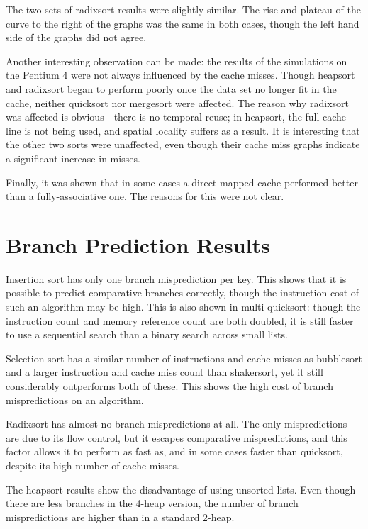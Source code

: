 The two sets of radixsort results were slightly similar. The rise and plateau of
the curve to the right of the graphs was the same in both cases, though the left
hand side of the graphs did not agree.

Another interesting observation can be made: the results of the simulations on
the Pentium 4 were not always influenced by the cache misses. Though heapsort
and radixsort began to perform poorly once the data set no longer fit in the
cache, neither quicksort nor mergesort were affected. The reason why radixsort
was affected is obvious - there is no temporal reuse; in heapsort, the full
cache line is not being used, and spatial locality suffers as a result. It is
interesting that the other two sorts were unaffected, even though their cache
miss graphs indicate a significant increase in misses.

Finally, it was shown that in some cases a direct-mapped cache performed better
than a fully-associative one. The reasons for this were not clear.

\section{Branch Prediction Results}

Insertion sort has only one branch misprediction per key. This shows that it is
possible to predict comparative branches correctly, though the instruction cost
of such an algorithm may be high. This is also shown in multi-quicksort: though
the instruction count and memory reference count are both doubled, it is still
faster to use a sequential search than a binary search across small lists.

Selection sort has a similar number of instructions and cache misses as
bubblesort and a larger instruction and cache miss count than shakersort, yet it
still considerably outperforms both of these. This shows the high cost of branch
mispredictions on an algorithm.

Radixsort has almost no branch mispredictions at all. The only mispredictions
are due to its flow control, but it escapes comparative mispredictions, and this
factor allows it to perform as fast as, and in some cases faster than quicksort,
despite its high number of cache misses.

The heapsort results show the disadvantage of using unsorted lists. Even though
there are less branches in the 4-heap version, the number of branch
mispredictions are higher than in a standard 2-heap.

